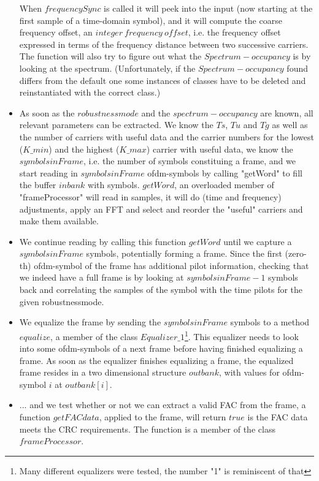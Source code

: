 \documentclass[11pt]{article}
\begin{document}
\begin{itemize}
When $frequencySync$ is called it will peek into the input
(now starting at the first sample of a time-domain symbol),
and it will compute  the coarse frequency offset, 
an  $integer\ frequency\ offset$, i.e. the frequency offset
expressed in terms of the frequency distance between two successive carriers.
The function will also try to figure out what the $Spectrum-occupancy$ is
by looking at the spectrum.
(Unfortunately, if the $Spectrum-occupancy$ found differs from the default one
some instances of classes have to be deleted and reinstantiated with
the correct class.)
\item 
As soon as the $robustnessmode$ and the $spectrum-occupancy$ are known,
all relevant parameters
can be extracted. We know the $Ts$, $Tu$ and $Tg$ as well as
the number of carriers with useful data and the carrier numbers for the
lowest ($K\_min$) and the highest ($K\_max$)
carrier with useful data, we know the $symbolsinFrame$, i.e. the number
of symbols constituing a frame, and we start reading in 
$symbolsinFrame$ ofdm-symbols by calling "getWord" to fill the buffer $inbank$
with  symbols.
$getWord$, an overloaded member of "frameProcessor"
will read in samples, it will do (time and frequency) adjustments, apply
an FFT and select and reorder the "useful" carriers and make them available.
\item 
We continue reading by calling this function $getWord$ until we
capture a $symbolsinFrame$ symbols, potentially forming a frame.
Since the first (zero-th) ofdm-symbol of the frame
has additional pilot information, checking that we indeed have a full
frame is by looking at $symbolsinFrame - 1$ symbols back and
correlating the samples of the symbol with the time pilots for the given
robustnessmode.
\item We equalize the frame by sending the $symbolsinFrame$ symbols
to a method $equalize$, a member of the class
$Equalizer\_1$\footnote{Many different equalizers were tested,
the number "1" is reminiscent of that}. This equalizer needs to look into
some ofdm-symbols of a next frame before having finished equalizing a frame.
As soon as the equalizer finishes equalizing a frame, the equalized
frame resides in a two dimensional structure  $outbank$,
with values for ofdm-symbol $i$ at $outbank [i]$.
\item ... and we test whether or not we can extract a valid FAC from the frame,
a function $getFACdata$, applied to the frame, will return $true$ is
the FAC data meets the CRC requirements. The function is a member of the
class $frameProcessor$.


\end{itemize}
\end{document}
